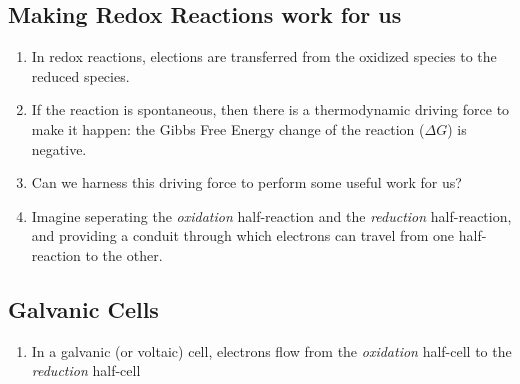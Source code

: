 \documentclass{article}  %
\begin{document}
\subsection*{Making Redox Reactions work for us}
\begin{enumerate}
    \item In redox reactions, elections are transferred from the oxidized species to the reduced species.
    \item If the reaction is spontaneous, then there is a thermodynamic driving force to make it happen: the Gibbs Free Energy change of the reaction ($\Delta G$) is negative.
    \item Can we harness this driving force to perform some useful work for us?
    \item Imagine seperating the \emph{oxidation} half-reaction and the \emph{reduction} half-reaction, and providing a conduit through which electrons can travel from one half-reaction to the other.
\end{enumerate}

\subsection*{Galvanic Cells}
\begin{enumerate}
    \item In a galvanic (or voltaic) cell, electrons flow from the \emph{oxidation} half-cell to the \emph{reduction} half-cell
\end{enumerate}
\end{document}
